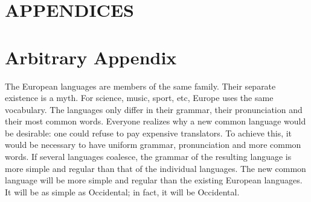 \chapter*{APPENDICES}

\begingroup\let\clearpage\relax
\chapter{Arbitrary Appendix}
\label{chap:appendix_arb}
\endgroup

The European languages are members of the same family. Their separate existence is a myth. For science, music, sport, etc, Europe uses the same vocabulary. The languages only differ in their grammar, their pronunciation and their most common words. Everyone realizes why a new common language would be desirable: one could refuse to pay expensive translators. To achieve this, it would be necessary to have uniform grammar, pronunciation and more common words. If several languages coalesce, the grammar of the resulting language is more simple and regular than that of the individual languages. The new common language will be more simple and regular than the existing European languages. It will be as simple as Occidental; in fact, it will be Occidental. 